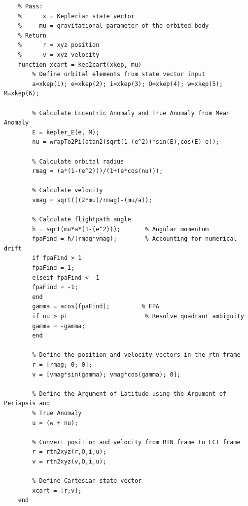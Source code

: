\documentclass[titlepage]{article}
\begin{document}
\begin{lstlisting}[label=lst:e.m,caption=Implementation of Newton-Raphson solution to inverting Kepler's Equation.]
	% Convert Keplerian orbital elements to Cartesian states
	% Pass:
	%      x = Keplerian state vector
	%     mu = gravitational parameter of the orbited body
	% Return
	%      r = xyz position
	%      v = xyz velocity
	function xcart = kep2cart(xkep, mu)
		% Define orbital elements from state vector input
		a=xkep(1); e=xkep(2); i=xkep(3); O=xkep(4); w=xkep(5); M=xkep(6);
		
		% Calculate Eccentric Anomaly and True Anomaly from Mean Anomaly
		E = kepler_E(e, M);
		nu = wrapTo2Pi(atan2(sqrt(1-(e^2))*sin(E),cos(E)-e));
		
		% Calculate orbital radius
		rmag = (a*(1-(e^2)))/(1+(e*cos(nu)));
		
		% Calculate velocity
		vmag = sqrt(((2*mu)/rmag)-(mu/a));
		
		% Calculate flightpath angle
		h = sqrt(mu*a*(1-(e^2)));       % Angular momentum
		fpaFind = h/(rmag*vmag);        % Accounting for numerical drift
		if fpaFind > 1
		fpaFind = 1;
		elseif fpaFind < -1
		fpaFind = -1;
		end
		gamma = acos(fpaFind);         % FPA
		if nu > pi                      % Resolve quadrant ambiguity
		gamma = -gamma;
		end
		
		% Define the position and velocity vectors in the rtn frame
		r = [rmag; 0; 0];
		v = [vmag*sin(gamma); vmag*cos(gamma); 0];
		
		% Define the Argument of Latitude using the Argument of Periapsis and
		% True Anomaly
		u = (w + nu); 
		
		% Convert position and velocity from RTN frame to ECI frame
		r = rtn2xyz(r,O,i,u);
		v = rtn2xyz(v,O,i,u);
		
		% Define Cartesian state vector
		xcart = [r;v];
	end
\end{lstlisting}
\end{document}
